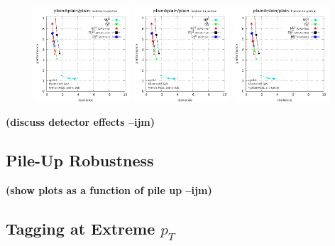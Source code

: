 \documentclass[11pt,letterpaper]{article}
\newcommand{\ijm}[1]{\textbf{\textcolor{llblue}{(#1 --ijm)}}}
\begin{document}
\begin{figure}
  \includegraphics[width=0.32\textwidth,page=66]{figures/shape-scan-levels.pdf}
  \hfill
  \includegraphics[width=0.32\textwidth,page=60]{figures/shape-scan-levels.pdf}
  \hfill
  \includegraphics[width=0.32\textwidth,page=54]{figures/shape-scan-levels.pdf}
  \caption{}\label{fig:shapes-ATLAS}
\end{figure}

\ijm{discuss detector effects}

\subsection{Pile-Up Robustness}\label{sec:pu_robust}

\ijm{show plots as a function of pile up}

\subsection{Tagging at Extreme $p_T$}\label{sec:pt_robust}
\end{document}

